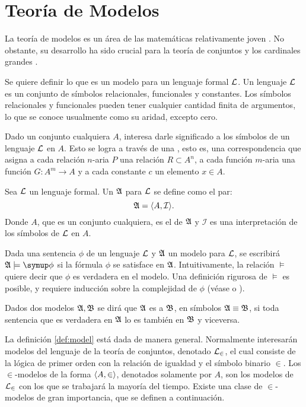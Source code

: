 \section{Teoría de Modelos}
\label{sec:models}

La teoría de modelos es un área de las matemáticas
relativamente joven \autocite[3]{chang_model_2012}.
No obstante, su desarrollo ha sido crucial para la teoría de conjuntos y los
cardinales grandes \autocite[xv]{kanamori_higher_2009}.

Se quiere definir lo que es un modelo para un lenguaje formal $\mathcal { L }$.
Un lenguaje $\mathcal { L }$ es un conjunto de símbolos relacionales, funcionales y constantes.
Los símbolos relacionales y funcionales pueden tener cualquier cantidad finita de argumentos,
lo que se conoce usualmente como su aridad, excepto cero.

Dado un conjunto cualquiera $A$, interesa darle significado a los símbolos de un
lenguaje $\mathcal { L }$ en $A$. Esto se logra a través de una , esto es,
una correspondencia que asigna a cada relación $n$-aria $P$ una relación
$R\subset A^n$, a cada función $m$-aria una función $G\colon A^m\to A$ y a cada
constante $c$ un elemento $x\in A$.

\begin{defi}\label{def:model}
    Sea $\mathcal { L }$ un lenguaje formal. Un  $\mathfrak { A }$ para $\mathcal { L }$ se define como el par:
    \[
        \mathfrak { A } = \langle A, \mathcal{I} \rangle.
    \]
    Donde $A$, que es un conjunto cualquiera, es el  de $\mathfrak { A }$ y
    $\mathcal{I}$ es una interpretación de los símbolos de $\mathcal { L }$ en $A$.
\end{defi}

Dada una sentencia $\phi$ de un lenguaje $\mathcal { L }$ y $\mathfrak { A }$ un modelo para $\mathcal { L }$,
se escribirá $\model{A}\models\phi$ si la fórmula $\phi$ se satisface en $\mathfrak { A }$.
Intuitivamente, la relación $\models$ quiere decir que $\phi$ es verdadera en el modelo.
Una definición rigurosa de $\models$ es posible, y requiere inducción sobre la complejidad
de $\phi$ (véase \autocite[\S 1.3]{chang_model_2012} o \autocite[\S 12]{jech_set_2003}).

Dados dos modelos $\mathfrak { A }, \mathfrak { B }$ se dirá que $\mathfrak { A }$ es  a $\mathfrak { B }$, en símbolos $\mathfrak { A }\equiv \mathfrak { B }$, si toda sentencia
que es verdadera en $\mathfrak { A }$ lo es también en $\mathfrak { B }$ y viceversa.

La definición \ref{def:model} está dada de manera general. Normalmente interesarán modelos
del lenguaje de la teoría de conjuntos, denotado $\mathcal { L }_\in$, el cual consiste de la lógica de
primer orden con la relación de igualdad y el símbolo binario $\in$.
Los $\in$-modelos de la forma $\langle A,\in \rangle$, denotados
solamente por $A$, son los modelos de $\mathcal { L }_\in$ con los que se trabajará la mayoría del tiempo.
Existe una clase de $\in$-modelos de gran importancia, que se definen a continuación.

